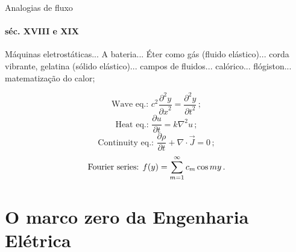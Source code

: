 \documentclass[aspectratio=169]{beamer}
\begin{document}
\begin{frame}{Analogias de fluxo}
\framesubtitle{séc. XVIII e XIX}
\begin{minipage}{0.4\textwidth}
Máquinas eletrostáticas... A bateria... Éter como gás (fluido elástico)... corda vibrante, gelatina (sólido elástico)... campos de fluidos... calórico... flógiston... matematização do calor;  
\end{minipage}
\begin{minipage}{0.57\textwidth}
\begin{equation}
\mbox{Wave eq.: }{c^2} \frac{{\partial}^{2} y}{{\partial x}^{2}} = \frac{{\partial}^{2} y}{{\partial t}^{2}} \,;
\end{equation}
\begin{equation}
\mbox{Heat eq.: } \frac{\partial u}{\partial t} = k {\nabla}^{2} u \,;
\end{equation}
\begin{equation}
\mbox{Continuity eq.: } \frac{\partial \rho}{\partial t} + \nabla \cdot \vec{J}  = 0 \,;
\end{equation} 
\begin{equation}
\mbox{Fourier series: } f(y) = \sum \limits_{m=1}^{\infty} c_{m} \cos m y \,. \\
\end{equation}
\end{minipage}
\end{frame}

\section{O marco zero da Engenharia Elétrica}
\end{document}

